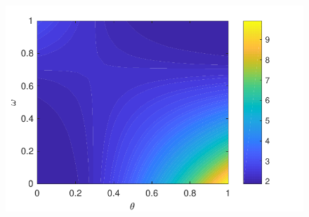 \documentclass[english,aspectratio=1610]{beamer}
\theoremstyle{mystyle}
\theoremstyle{mystyle}
\theoremstyle{mystyle}
\begin{document}
\begin{frame}
\begin{columns}[T]
\begin{figure}
		\includegraphics[height=0.42\textheight]{plots/chain/plot_chain_colormap}
	\end{figure}
	\end{columns}
\end{frame}
\end{document}
